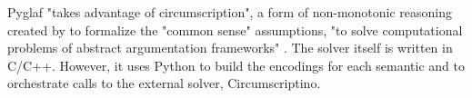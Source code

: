 Pyglaf "takes advantage of circumscription", a form of non-monotonic reasoning created by \citet{circumpscription} to formalize the "common sense" assumptions, "to solve computational problems of abstract argumentation frameworks" \citep{pyglaf}. The solver itself is written in C/C++. However, it uses Python to build the encodings for each semantic and to orchestrate calls to the external solver, Circumscriptino. 

